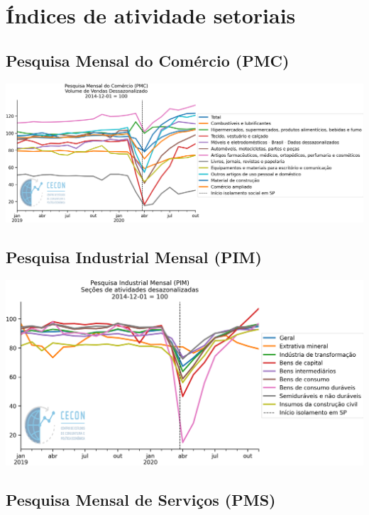 \documentclass{SelfArx}
\begin{document}
\section*{Índices de atividade setoriais}
\label{sec:org9edfcd4}


\subsection*{Pesquisa Mensal do Comércio (PMC)}
\label{sec:orge725ce1}

\begin{center}
\includegraphics[width=.9\linewidth]{./figs/Setoriais/PMC_IBGE.png}
\end{center}


\subsection*{Pesquisa Industrial Mensal (PIM)}
\label{sec:org1c2743a}

\begin{center}
\includegraphics[width=.9\linewidth]{./figs/Setoriais/PIM_IBGE.png}
\end{center}


\subsection*{Pesquisa Mensal de Serviços (PMS)}
\label{sec:org609c522}
\end{document}
